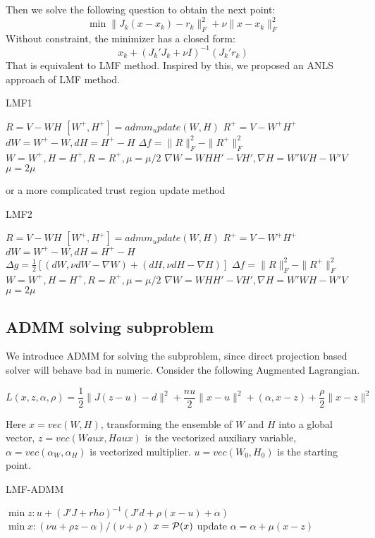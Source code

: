 \documentclass{article}
\renewcommand{\grad}{\nabla}
\begin{document}
Then we solve the following question to obtain the next point:
$$\min \|J_k(x-x_k) - r_k\|_F^2 + \nu \|x-x_k\|_F^2$$
Without constraint, the minimizer has a closed form:
$$ x_k + (J_k'J_k + \nu I)^{-1}(J_k'r_k)$$
That is equivalent to LMF method. Inspired by this, we proposed an ANLS approach of LMF method.

\begin{algorithm}[H]
	\caption{LMF1}
	\begin{algorithmic}[1]
		\STATE $R = V - WH$
		\STATE $[W^+, H^+] = admm_update(W,H)$
		\STATE $R^+ = V - W^+H^+$
		\STATE $dW = W^+ - W, dH = H^+-H$
		\STATE $\Delta f = \|R\|_F^2 - \|R^+\|_F^2$
		\STATE $W = W^+, H = H^+, R = R^+, \mu = \mu/2$
		\STATE $\grad W = WHH'-VH', \grad H = W'WH-W'V$
		\ELSE
		\STATE $\mu = 2\mu$
		\ENDIF
		\ENDFOR
	\end{algorithmic}
\end{algorithm}
or a more complicated trust region update method
\begin{algorithm}[H]
	\caption{LMF2}
	\begin{algorithmic}[1]
		\STATE $R = V - WH$
		\STATE $[W^+, H^+] = admm_update(W,H)$
		\STATE $R^+ = V - W^+H^+$
		\STATE $dW = W^+ - W, dH = H^+-H$
		\STATE $\Delta g = \frac 12[(dW, \nu dW - \grad W) + (dH, \nu dH - \grad H)]$
		\STATE{$\nu = 4\nu$}
		\ENDIF
		\STATE $\Delta f = \|R\|_F^2 - \|R^+\|_F^2$
		\STATE $W = W^+, H = H^+, R = R^+, \mu = \mu/2$
		\STATE $\grad W = WHH'-VH', \grad H = W'WH-W'V$
		\ELSE
		\STATE $\mu = 2\mu$
		\ENDIF
		\ENDFOR
	\end{algorithmic}
\end{algorithm}

\subsection{ADMM solving subproblem}
We introduce ADMM for solving the subproblem, since direct projection based solver will behave bad in numeric. Consider the following Augmented Lagrangian.

$$L(x, z, \alpha, \rho) = \frac{1}{2}\|J(z-u) - d\|^2 + \frac{nu}{2}\|x-u\|^2 + (\alpha, x-z) + \frac{\rho}{2}\|x-z\|^2$$

Here $x = vec(W,H)$, transforming the ensemble of $W$ and $H$ into a global vector, $z = vec(Waux, Haux)$ is the vectorized auxiliary variable, $\alpha = vec(\alpha_W, \alpha_H)$ is vectorized multiplier. $u = vec(W_0, H_0)$ is the starting point.
\begin{algorithm}[H]
	\caption{LMF-ADMM}
	\begin{algorithmic}[1]
		\STATE $\min z: u + (J'J + rho)^{-1}(J'd + \rho(x-u) + \alpha)$
		\STATE $\min x: (\nu u + \rho z - \alpha)/(\nu + \rho)$
		\STATE $x = \P(x)$
		\STATE update $\alpha = \alpha + \mu (x-z)$
	\end{algorithmic}
\end{algorithm}
\end{document}
